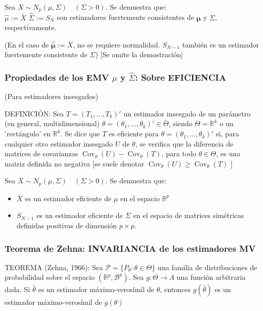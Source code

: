 \documentclass[11pt,a4paper]{article}
\begin{document}
Sea $X \sim N_{p}(\mu, \Sigma) \quad(\Sigma>0)$. Se demuestra que: \\
$\hat{\mu}:=\bar{X}$ $\hat{\Sigma}:=S_{N}$ son estimadores fuertemente consistentes de $\boldsymbol{\mu}$ y $\Sigma$, respectivamente.

(En el caso de $\hat{\boldsymbol{\mu}}:=\overline{X}$, no se requiere normalidad. $S_{N-1}$ también es un estimador fuertemente consistente de $\Sigma$) [Se omite la demostración]

\subsubsection{Propiedades de los EMV \texorpdfstring{$\hat{\mu}$}) y \texorpdfstring{$\hat{\Sigma}$}): Sobre EFICIENCIA}
(Para estimadores insesgados)

DEFINICIÓN: Sea $T=(T_{1}, \ldots, T_{k})'$ un estimador insesgado de un parámetro (en general, multidimensional) $\theta=(\theta_{1}, \ldots, \theta_{k})' \in \bar{\Theta}$, siendo $\Theta=\mathbb{R}^{k}$ o un 'rectángulo' en $\mathbb{R}^{k}$. Se dice que $T$ es eficiente para $\theta=(\theta_{1}, \ldots, \theta_{k})'$ si, para cualquier otro estimador insesgado $U$ de $\theta$, se verifica que la diferencia de matrices de covarianzas $\overline{\operatorname{Cov}_{\theta}(U)}-\operatorname{Cov}_{\theta}(T)$, para todo $\theta \in \Theta$, es una matriz definida no negativa [se suele denotar $\operatorname{Cov}_{\theta}(U) \geq \operatorname{Cov}_{\theta}(T)$ ]

Sea $X \sim N_{p}(\mu, \Sigma) \quad(\Sigma>0)$. Se demuestra que:
\begin{itemize}
\item $\bar{X}$ es un estimador eficiente de $\mu$ en el espacio $\mathbb{R}^{p}$
\item $S_{N-1}$ es un estimador eficiente de $\Sigma$ en el espacio de matrices simétricas definidas positivas de dimensión $p \times p$.
\end{itemize}

\subsubsection{Teorema de Zehna: INVARIANCIA de los estimadores MV}
TEOREMA (Zehna, 1966): Sea $\mathcal{P}=\{P_{\theta}: \theta \in \Theta\}$ una familia de distribuciones de probabilidad sobre el espacio $(\mathbb{R}^{p}, \mathcal{B}^{p})$. Sea $g: \Theta \rightarrow \Lambda$ una función arbitraria dada. Si $\hat{\theta}$ es un estimador máximo-verosímil de $\theta$, entonces $g(\hat{\theta})$ es un estimador máximo-verosímil de $g(\theta)$
\end{document}
